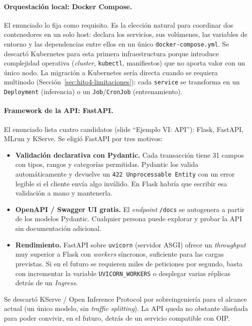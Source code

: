 \documentclass[12pt,a4paper]{report}
\begin{document}
\paragraph{Orquestación local: Docker Compose.} El enunciado lo fija como requisito. Es la elección natural para coordinar dos contenedores en un solo host: declara los servicios, sus volúmenes, las variables de entorno y las dependencias entre ellos en un único \texttt{docker-compose.yml}. Se descartó Kubernetes para esta primera infraestructura porque introduce complejidad operativa (\textit{cluster}, \texttt{kubectl}, manifiestos) que no aporta valor con un único nodo. La migración a Kubernetes sería directa cuando se requiera multinodo (Sección~\ref{sec:hito4-limitaciones}): cada \texttt{service} se transforma en un \texttt{Deployment} (inferencia) o un \texttt{Job}/\texttt{CronJob} (entrenamiento).

\paragraph{Framework de la API: FastAPI.} El enunciado lista cuatro candidatos (slide ``Ejemplo VI: API''): Flask, FastAPI, MLrun y KServe. Se eligió FastAPI por tres motivos:
\begin{itemize}
    \item \textbf{Validación declarativa con Pydantic.} Cada transacción tiene 31 campos con tipos, rangos y categorías permitidas. Pydantic los valida automáticamente y devuelve un \texttt{422 Unprocessable Entity} con un error legible si el cliente envía algo inválido. En Flask habría que escribir esa validación a mano y mantenerla.
    \item \textbf{OpenAPI / Swagger UI gratis.} El \textit{endpoint} \texttt{/docs} se autogenera a partir de los modelos Pydantic. Cualquier persona puede explorar y probar la API sin documentación adicional.
    \item \textbf{Rendimiento.} FastAPI sobre \texttt{uvicorn} (servidor ASGI) ofrece un \textit{throughput} muy superior a Flask con \textit{workers} síncronos, suficiente para las cargas previstas. Si en el futuro se requieren miles de peticiones por segundo, basta con incrementar la variable \texttt{UVICORN\_WORKERS} o desplegar varias réplicas detrás de un \textit{Ingress}.
\end{itemize}
Se descartó KServe / Open Inference Protocol por sobreingeniería para el alcance actual (un único modelo, sin \textit{traffic splitting}). La API queda no obstante diseñada para poder convivir, en el futuro, detrás de un servicio compatible con OIP.
\end{document}
